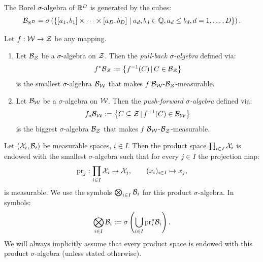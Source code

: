 \begin{Lem}[Borel $\sigma$-algebra on $\R^D$]    
    The Borel $\sigma$-algebra of $\R^D$ is generated by the cubes:
\[ \mathcal{B}_{\mathbb{R}^D} = \sigma\left (\left \{ [a_1,b_1] \times \cdots \times [a_D,b_D]\;|\; a_d, b_d \in \mathbb{Q}, a_d \le b_d, d=1,\dots,D    \right \}\right ).  \]
\end{Lem}

\begin{DefLem}
    \label{sigma-algebra-map}
    Let $f: \mathcal{W} \to \mathcal{Z}$ be any mapping.
    \begin{enumerate}
        \item Let $\mathcal{B}_{\mathcal{Z}}$ be a $\sigma$-algebra on $\mathcal{Z}$. Then the \emph{pull-back $\sigma$-algebra} defined via:
            \[ f^*\mathcal{B}_{\mathcal{Z}} := \left \{ f^{-1}(C)\,|\, C \in \mathcal{B}_{\mathcal{Z}}   \right \} \]
            is the smallest $\sigma$-algebra $\mathcal{B}_{\mathcal{W}}$ that makes $f$ $\mathcal{B}_{\mathcal{W}}$-$\mathcal{B}_{\mathcal{Z}}$-measurable.
        \item Let $\mathcal{B}_{\mathcal{W}}$ be a $\sigma$-algebra on $\mathcal{W}$. Then the \emph{push-forward $\sigma$-algebra} defined via:
            \[ f_*\mathcal{B}_{\mathcal{W}} := \left \{ C \subseteq \mathcal{Z}\,|\, f^{-1}(C) \in \mathcal{B}_{\mathcal{W}}   \right \} \]
            is the biggest $\sigma$-algebra $\mathcal{B}_{\mathcal{Z}}$ that makes $f$ $\mathcal{B}_{\mathcal{W}}$-$\mathcal{B}_{\mathcal{Z}}$-measurable.
    \end{enumerate}
\end{DefLem}


\begin{Def}
    Let $(\mathcal{X}_i,\mathcal{B}_i)$ be measurable spaces, $i \in I$.
    Then the product space $\prod_{i \in I} \mathcal{X}_i$ is endowed with the smallest $\sigma$-algebra
    such that for every $j\in I$ the projection map:
    \[ \mathrm{pr}_j: \prod_{i \in I} \mathcal{X}_i \to \mathcal{X}_j,\qquad (x_i)_{i \in I} \mapsto x_j, \]
    is measurable. We use the symbols $\bigotimes_{i \in I} \mathcal{B}_i$ for this product $\sigma$-algebra.
    In symbols:
    \[ \bigotimes_{i \in I} \mathcal{B}_i := \sigma\left ( \bigcup_{i \in I} \mathrm{pr}_i^*\mathcal{B}_i\right ). \]
  We will always implicitly assume that every product space is endowed with this product $\sigma$-algebra (unless stated otherwise).
\end{Def}

